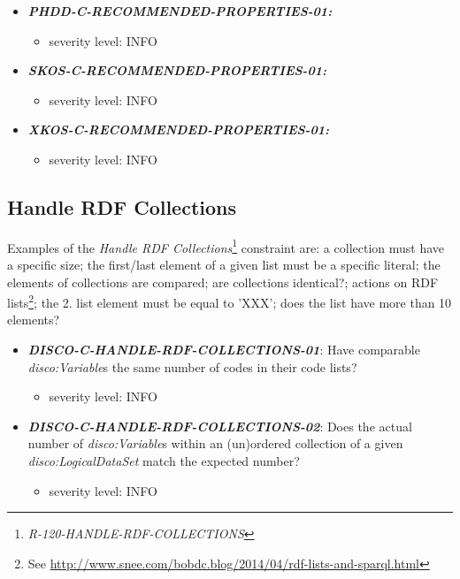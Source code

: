 \documentclass{llncs}
\begin{document}
\begin{itemize}
	\item \textbf{{\em PHDD-C-RECOMMENDED-PROPERTIES-01:}}
	\begin{itemize}
		\item severity level: INFO
	\end{itemize}
\end{itemize}

\begin{itemize}
	\item \textbf{{\em SKOS-C-RECOMMENDED-PROPERTIES-01:}}
	\begin{itemize}
		\item severity level: INFO
	\end{itemize}
\end{itemize}

\begin{itemize}
	\item \textbf{{\em XKOS-C-RECOMMENDED-PROPERTIES-01:}}
	\begin{itemize}
		\item severity level: INFO
	\end{itemize}
\end{itemize}

\subsection{Handle RDF Collections}

Examples of the \emph{Handle RDF Collections}\footnote{\emph{R-120-HANDLE-RDF-COLLECTIONS}} constraint are: a collection must have a specific size; the first/last element of a given list must be a specific literal; the elements of collections are compared; are collections identical?; actions on RDF lists\footnote{See \url{http://www.snee.com/bobdc.blog/2014/04/rdf-lists-and-sparql.html}}; the 2. list element must be equal to 'XXX'; does the list have more than 10 elements?

\begin{itemize}
	\item \textbf{{\em DISCO-C-HANDLE-RDF-COLLECTIONS-01}}: Have comparable \emph{disco:Variable}s the same number of codes in their code lists?
	\begin{itemize}
		\item severity level: INFO
	\end{itemize}
	\item \textbf{{\em DISCO-C-HANDLE-RDF-COLLECTIONS-02}}: Does the actual number of \emph{disco:Variable}s within an (un)ordered collection of a given \emph{disco:LogicalDataSet} match the expected number? 
	\begin{itemize}
		\item severity level: INFO
	\end{itemize}
\end{itemize}
\end{document}
